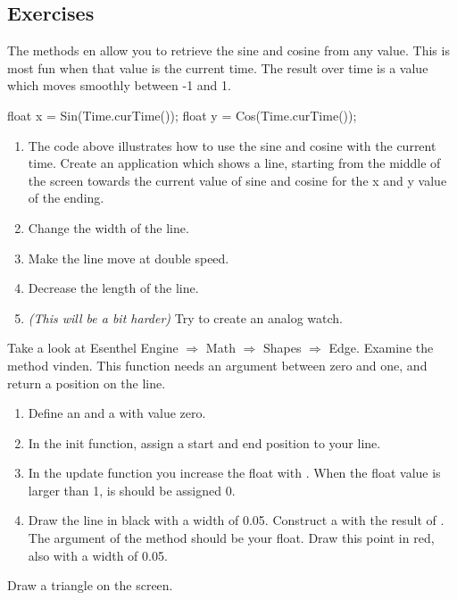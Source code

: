 \subsection{Exercises}

The methods  en  allow you to retrieve the sine and cosine from any value. This is most fun when that value is the current time. The result over time is a value which moves smoothly between -1 and 1.

\begin{code}
float x = Sin(Time.curTime());
float y = Cos(Time.curTime());
\end{code}

\begin{enumerate}
\item The code above illustrates how to use the sine and cosine with the current time. Create an application which shows a line, starting from the middle of the screen towards the current value of sine and cosine for the x and y value of the ending.
\item Change the width of the line.
\item Make the line move at double speed.
\item Decrease the length of the line. 
\item \textit{(This will be a bit harder)} Try to create an analog watch.
\end{enumerate}

Take a look at Esenthel Engine $\Rightarrow$ Math $\Rightarrow$ Shapes $\Rightarrow$ Edge. Examine the method  vinden. This function needs an argument between zero and one, and return a position on the line.

\begin{enumerate}
\item Define an  and a  with value zero.
\item In the init function, assign a start and end position to your line.
\item In the update function you increase the float with . When the float value is larger than 1, is should be assigned 0.
\item Draw the line in black with a width of 0.05. Construct a  with the result of . The argument of the method should be your float. Draw this point in red, also with a width of 0.05.
\end{enumerate}

Draw a triangle on the screen.

